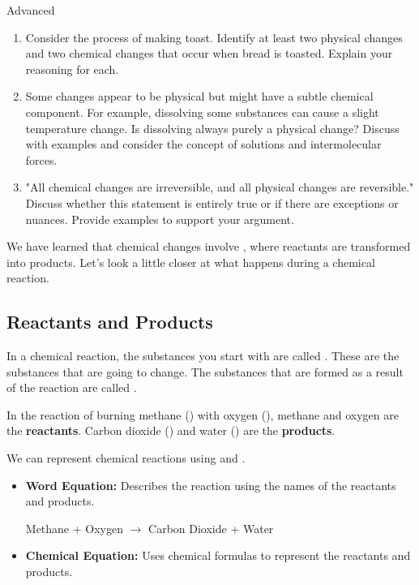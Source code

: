 \begin{tieredquestions}{Advanced}
\begin{enumerate}
    \item  Consider the process of making toast. Identify at least two physical changes and two chemical changes that occur when bread is toasted. Explain your reasoning for each.
    \item  Some changes appear to be physical but might have a subtle chemical component. For example, dissolving some substances can cause a slight temperature change.  Is dissolving always purely a physical change? Discuss with examples and consider the concept of solutions and intermolecular forces. 
    \item  "All chemical changes are irreversible, and all physical changes are reversible."  Discuss whether this statement is entirely true or if there are exceptions or nuances. Provide examples to support your argument.
\end{enumerate}
\end{tieredquestions}


\FloatBarrier

We have learned that chemical changes involve , where reactants are transformed into products.  Let's look a little closer at what happens during a chemical reaction.

\subsection{Reactants and Products}

In a chemical reaction, the substances you start with are called . These are the substances that are going to change. The substances that are formed as a result of the reaction are called .

\begin{example}
In the reaction of burning methane () with oxygen (), methane and oxygen are the \textbf{reactants}. Carbon dioxide () and water () are the \textbf{products}.
\end{example}

We can represent chemical reactions using  and .

\begin{itemize}
    \item \textbf{Word Equation:} Describes the reaction using the names of the reactants and products.
    \begin{example}
    Methane + Oxygen $\rightarrow$ Carbon Dioxide + Water
    \end{example}
    \item \textbf{Chemical Equation:} Uses chemical formulas to represent the reactants and products.
    \begin{example}
    \end{example}
\end{itemize}

